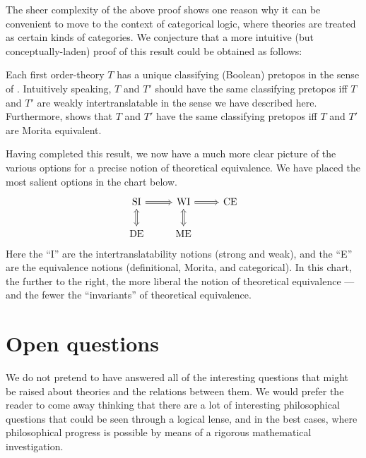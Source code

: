 \begin{aside} The sheer complexity of the above proof shows one reason
  why it can be convenient to move to the context of categorical
  logic, where theories are treated as certain kinds of categories.
  We conjecture that a more intuitive (but conceptually-laden) proof
  of this result could be obtained as follows:

  Each first order-theory $T$ has a unique classifying (Boolean)
  pretopos in the sense of \cite{makkai1987,awodey}.  Intuitively
  speaking, $T$ and $T'$ should have the same classifying pretopos iff
  $T$ and $T'$ are weakly intertranslatable in the sense we have
  described here.  Furthermore, \cite{tsementzis} shows that $T$ and
  $T'$ have the same classifying pretopos iff $T$ and $T'$ are Morita
  equivalent.
\end{aside}

Having completed this result, we now have a much more clear picture of
the various options for a precise notion of theoretical equivalence.
We have placed the most salient options in the chart below.
\[ \begin{tikzcd}
    \mathrm{SI} \arrow[Rightarrow]{r} \arrow[Leftrightarrow]{d} &
    \mathrm{WI} \arrow[Leftrightarrow]{d} \arrow[Rightarrow]{r} & \mathrm{CE} \\
    \mathrm{DE} & \mathrm{ME}
  \end{tikzcd} \] Here the ``I'' are the intertranslatability notions
(strong and weak), and the ``E'' are the equivalence notions
(definitional, Morita, and categorical).  In this chart, the further
to the right, the more liberal the notion of theoretical equivalence
--- and the fewer the ``invariants'' of theoretical equivalence.


\section{Open questions}




We do not pretend to have answered all of the interesting questions
that might be raised about theories and the relations between them.
We would prefer the reader to come away thinking that there are a lot
of interesting philosophical questions that could be seen through a
logical lense, and in the best cases, where philosophical progress is
possible by means of a rigorous mathematical investigation.

